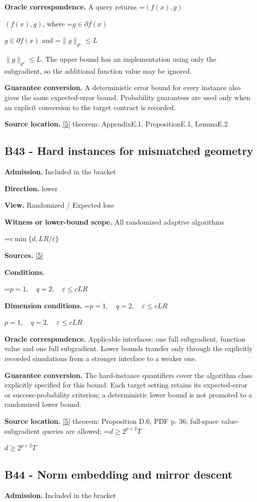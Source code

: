 \documentclass[10pt,a4paper]{article}
\newcommand{\AtlasMath}[1]{\par\begingroup\centering\setbox0=\hbox{$\displaystyle #1$}\ifdim\wd0>1.4\linewidth\typeout{ATLAS WIDE FORMULA: \the\wd0}\fi\ifdim\wd0>\linewidth\resizebox{\linewidth}{!}{\box0}\else\box0\fi\par\endgroup}
\newcommand{\AtlasInlineMath}[1]{\begingroup\setbox0=\hbox{$#1$}\ifdim\wd0>.4\linewidth\endgroup\AtlasMath{#1}\else\endgroup$#1$\fi}
\begin{document}
\textbf{Oracle correspondence.} A query returns \AtlasInlineMath{(f(x),g)}, where \AtlasInlineMath{g\in\partial f(x)} and \AtlasInlineMath{\|g\|_{q^\star}\le L}. The upper bound has an implementation using only the subgradient, so the additional function value may be ignored.

\textbf{Guarantee conversion.} A deterministic error bound for every instance also gives the same expected-error bound. Probability guarantees are used only when an explicit conversion to the target contract is recorded.

\textbf{Source location.} \href{https://arxiv.org/pdf/2609.32910}{[5]} theorem: AppendixE.1, PropositionE.1, LemmaE.2

\subsection{B43 - Hard instances for mismatched geometry}
\textbf{Admission.} Included in the bracket

\textbf{Direction.} lower

\textbf{View.} Randomized / Expected loss

\textbf{Witness or lower-bound scope.} All randomized adaptive algorithms

\AtlasMath{c\min\{d,LR/\varepsilon\}}
\textbf{Sources.} \href{https://arxiv.org/pdf/2609.32910}{[5]}

\textbf{Conditions.} 
\AtlasMath{p=1,\quad q=2,\quad\varepsilon\le cLR}


\textbf{Dimension conditions.} \AtlasInlineMath{p=1,\quad q=2,\quad\varepsilon\le cLR}

\textbf{Oracle correspondence.} Applicable interfaces: one full subgradient, function value and one full subgradient. Lower bounds transfer only through the explicitly recorded simulations from a stronger interface to a weaker one.

\textbf{Guarantee conversion.} The hard-instance quantifiers cover the algorithm class explicitly specified for this bound. Each target setting retains its expected-error or success-probability criterion; a deterministic lower bound is not promoted to a randomized lower bound.

\textbf{Source location.} \href{https://arxiv.org/pdf/2609.32910}{[5]} theorem: Proposition D.6, PDF p. 36; full-space value-subgradient queries are allowed; \AtlasInlineMath{d\ge2^{p+2}T}

\subsection{B44 - Norm embedding and mirror descent}
\textbf{Admission.} Included in the bracket
\end{document}
